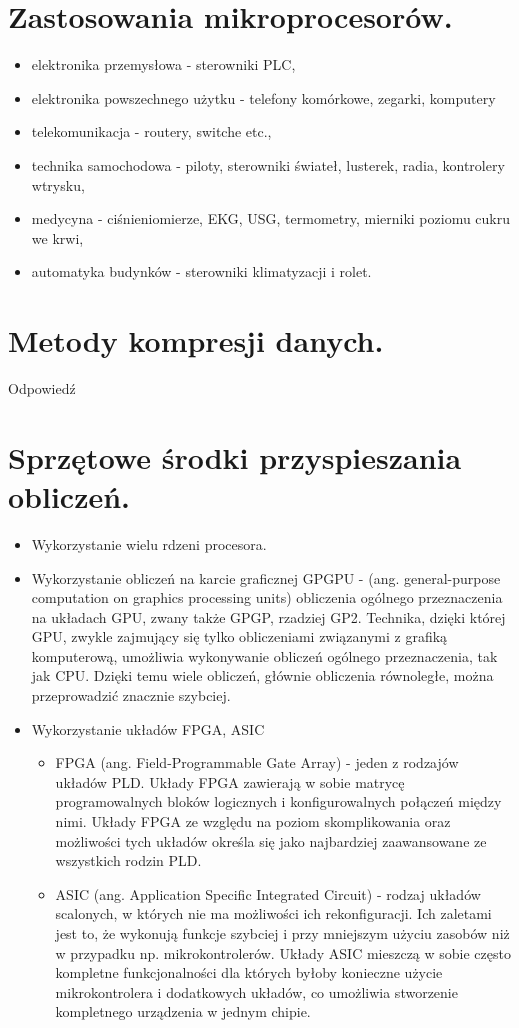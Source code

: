 \documentclass[12pt,a4paper]{article}
\begin{document}
	\section{Zastosowania mikroprocesorów.}
	\begin{itemize}
		\item elektronika przemysłowa - sterowniki PLC,
		\item elektronika powszechnego użytku - telefony komórkowe, zegarki, komputery
		\item telekomunikacja - routery, switche etc.,
		\item technika samochodowa - piloty, sterowniki świateł, lusterek, radia, kontrolery wtrysku,
		\item medycyna - ciśnieniomierze, EKG, USG, termometry, mierniki poziomu cukru we krwi,
		\item automatyka budynków - sterowniki klimatyzacji i rolet.
	\end{itemize}

	\section{Metody kompresji danych.}
	Odpowiedź

	\section{Sprzętowe środki przyspieszania obliczeń.}
	\begin{itemize}
		\item Wykorzystanie wielu rdzeni procesora.
		\item Wykorzystanie obliczeń na karcie graficznej GPGPU - (ang. general-purpose computation on graphics processing units) obliczenia ogólnego przeznaczenia na układach GPU, zwany także GPGP, rzadziej GP2. Technika, dzięki której GPU, zwykle zajmujący się tylko obliczeniami związanymi z grafiką komputerową, umożliwia wykonywanie obliczeń ogólnego przeznaczenia, tak jak CPU. Dzięki temu wiele obliczeń, głównie obliczenia równoległe, można przeprowadzić znacznie szybciej.
		\item Wykorzystanie układów FPGA, ASIC
		\begin{itemize}
			\item FPGA (ang. Field-Programmable Gate Array) - jeden z rodzajów układów PLD. Układy FPGA zawierają w sobie matrycę programowalnych bloków logicznych i konfigurowalnych połączeń między nimi. Układy FPGA ze względu na poziom skomplikowania oraz możliwości tych układów określa się jako najbardziej zaawansowane ze wszystkich rodzin PLD.
			\item ASIC (ang. Application Specific Integrated Circuit) - rodzaj układów scalonych, w których nie ma możliwości ich rekonfiguracji. Ich zaletami jest to, że wykonują funkcje szybciej i przy mniejszym użyciu zasobów niż w przypadku np. mikrokontrolerów. Układy ASIC mieszczą w sobie często kompletne funkcjonalności dla których byłoby konieczne użycie mikrokontrolera i dodatkowych układów, co umożliwia stworzenie kompletnego urządzenia w jednym chipie.
		\end{itemize}
	\end{itemize}
\end{document}
